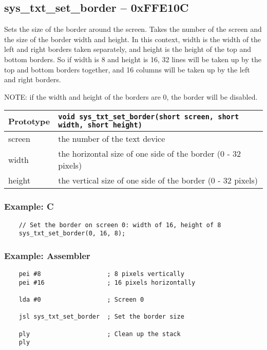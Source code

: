 \subsection*{sys\_txt\_set\_border -- 0xFFE10C}
Sets the size of the border around the screen. Takes the number of the screen and the size of the border width and height. In this context, width is the width of the left and right borders taken separately, and height is the height of the top and bottom borders. So if width is 8 and height is 16, 32 lines will be taken up by the top and bottom borders together, and 16 columns will be taken up by the left and right borders.

NOTE: if the width and height of the borders are 0, the border will be disabled.

\bigskip

\begin{tabular}{|l||l|} \hline
Prototype & \lstinline!void sys_txt_set_border(short screen, short width, short height)! \\ \hline
screen & the number of the text device \\ \hline
width & the horizontal size of one side of the border (0 - 32 pixels) \\ \hline
height & the vertical size of one side of the border (0 - 32 pixels) \\ \hline
\end{tabular}

\subsubsection*{Example: C}
\begin{lstlisting}
    // Set the border on screen 0: width of 16, height of 8
    sys_txt_set_border(0, 16, 8);
\end{lstlisting}

\subsubsection*{Example: Assembler}
\begin{verbatim}
    pei #8                  ; 8 pixels vertically
    pei #16                 ; 16 pixels horizontally

    lda #0                  ; Screen 0

    jsl sys_txt_set_border  ; Set the border size

    ply                     ; Clean up the stack
    ply
\end{verbatim}


